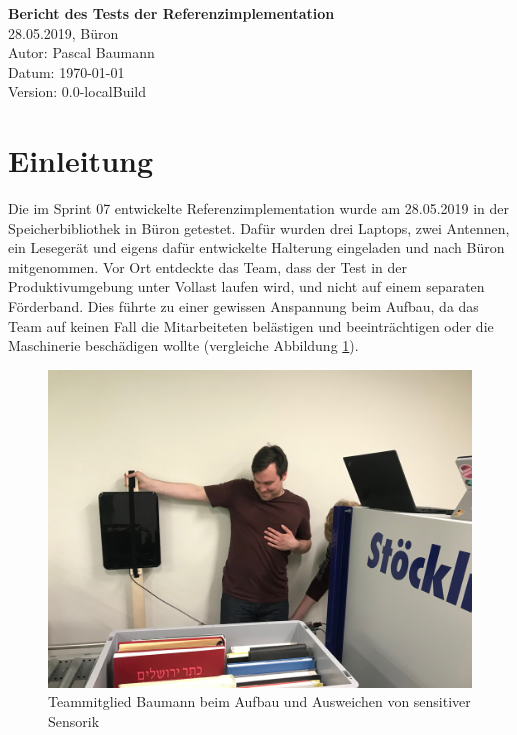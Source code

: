 \documentclass[parskip=full, a4paper]{scrartcl}
\providecommand{\docversion}{0.0-localBuild}
\begin{document}
\begin{titlepage}
\vspace*{2.5cm}
\noindent
\Huge{\textbf{Bericht des Tests der Referenzimplementation}} \\
\noindent
\Large{28.05.2019, Büron}\\
\vfill
\noindent
\large{Autor: Pascal Baumann}\\
\noindent
\large{Datum: \today}\\
\noindent
\large{Version: \docversion}\\
\end{titlepage}

\tableofcontents
\clearpage

\section{Einleitung}
Die im Sprint 07 entwickelte Referenzimplementation wurde am 28.05.2019 in der Speicherbibliothek in Büron getestet. Dafür wurden drei Laptops, zwei Antennen, ein Lesegerät und eigens dafür entwickelte Halterung eingeladen und nach Büron mitgenommen. Vor Ort entdeckte das Team, dass der Test in der Produktivumgebung unter Vollast laufen wird, und nicht auf einem separaten Förderband. Dies führte zu einer gewissen Anspannung beim Aufbau, da das Team auf keinen Fall die Mitarbeiteten belästigen und beeinträchtigen oder die Maschinerie beschädigen wollte (vergleiche Abbildung \ref{fig:AufbauSensorik}).

\begin{figure}[htb]
	\centering
	\includegraphics[keepaspectratio,width=\textwidth]{img/Testaufbau.jpg}
	\caption{Teammitglied Baumann beim Aufbau und Ausweichen von sensitiver Sensorik}
	\label{fig:AufbauSensorik}
\end{figure}
\end{document}
